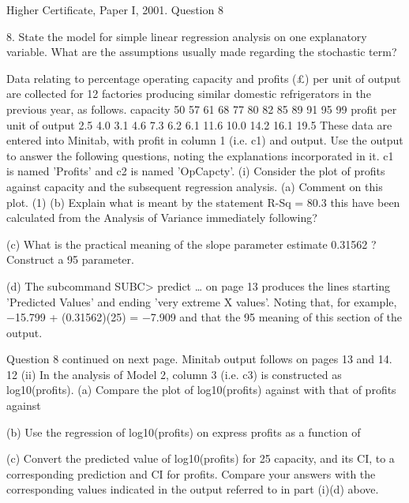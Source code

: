\documentclass[a4paper,12pt]{article}
\begin{document}
Higher Certificate, Paper I, 2001. Question 8

\begin{framed}

8. State the model for simple linear regression analysis on one explanatory variable.
What are the assumptions usually made regarding the stochastic term?

Data relating to percentage operating capacity and profits (£) per unit of output are
collected for 12 factories producing similar domestic refrigerators in the previous
year, as follows.
capacity
50 57 61 68 77 80 82 85 89 91 95 99
profit per unit
of output
2.5 4.0 3.1 4.6 7.3 6.2 6.1 11.6 10.0 14.2 16.1 19.5
These data are entered into Minitab, with profit in column 1 (i.e. c1) and
output. Use the output to answer the following questions, noting the explanations
incorporated in it. c1 is named 'Profits' and c2 is named 'OpCapcty'.
(i) Consider the plot of profits against capacity and the subsequent regression
analysis.
(a) Comment on this plot.
(1)
(b) Explain what is meant by the statement R-Sq = 80.3%
this have been calculated from the Analysis of Variance
immediately following?

(c) What is the practical meaning of the slope parameter estimate
0.31562 ? Construct a 95%
parameter.

(d) The subcommand SUBC> predict … on page 13 produces the
lines starting 'Predicted Values' and ending 'very extreme X values'.
Noting that, for example, −15.799 + (0.31562)(25) = −7.909 and
that the 95%
meaning of this section of the output.

Question 8 continued on next page.
Minitab output follows on pages 13 and 14.
12
(ii) In the analysis of Model 2, column 3 (i.e. c3) is constructed as
log10(profits).
(a) Compare the plot of log10(profits) against %
with that of profits against %

(b) Use the regression of log10(profits) on %
express profits as a function of %

(c) Convert the predicted value of log10(profits) for 25%
capacity, and its CI, to a corresponding prediction and CI for
profits. Compare your answers with the corresponding values
indicated in the output referred to in part (i)(d) above.


\end{framed}
\end{document}
